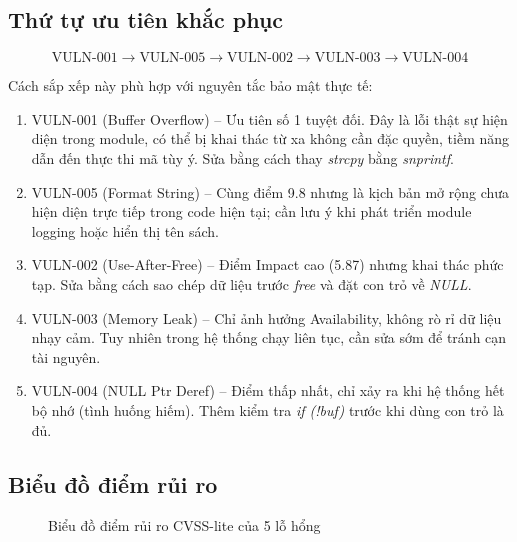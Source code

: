 \subsection{Thứ tự ưu tiên khắc phục}

\[
\text{VULN-001} \rightarrow \text{VULN-005} \rightarrow \text{VULN-002}
\rightarrow \text{VULN-003} \rightarrow \text{VULN-004}
\]

Cách sắp xếp này phù hợp với nguyên tắc bảo mật thực tế:

\begin{enumerate}
    \item VULN-001 (Buffer Overflow) -- Ưu tiên số 1 tuyệt đối. Đây là lỗi thật
          sự hiện diện trong module, có thể bị khai thác từ xa không cần đặc
          quyền, tiềm năng dẫn đến thực thi mã tùy ý. Sửa bằng cách thay
          \textit{strcpy} bằng \textit{snprintf}.
    \item VULN-005 (Format String) -- Cùng điểm 9.8 nhưng là kịch bản mở rộng
          chưa hiện diện trực tiếp trong code hiện tại; cần lưu ý khi phát triển
          module logging hoặc hiển thị tên sách.
    \item VULN-002 (Use-After-Free) -- Điểm Impact cao (5.87) nhưng khai thác
          phức tạp. Sửa bằng cách sao chép dữ liệu trước \textit{free} và đặt
          con trỏ về \textit{NULL}.
    \item VULN-003 (Memory Leak) -- Chỉ ảnh hưởng Availability, không rò rỉ dữ
          liệu nhạy cảm. Tuy nhiên trong hệ thống chạy liên tục, cần sửa sớm để
          tránh cạn tài nguyên.
    \item VULN-004 (NULL Ptr Deref) -- Điểm thấp nhất, chỉ xảy ra khi hệ thống
          hết bộ nhớ (tình huống hiếm). Thêm kiểm tra \textit{if (!buf)} trước
          khi dùng con trỏ là đủ.
\end{enumerate}

\subsection{Biểu đồ điểm rủi ro}

\begin{figure}[H]
\centering
{}
\caption{Biểu đồ điểm rủi ro CVSS-lite của 5 lỗ hổng}
\end{figure}

